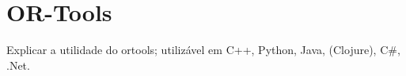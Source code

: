\documentclass[
12pt,				%
openright,			%
oneside,			%
a4paper,			%
english,			%
french,				%
spanish,			%
brazil,				%
]{abntex2}
\begin{document}

\section{OR-Tools}
\label{sec:ortools}

Explicar a utilidade do ortools; utilizável em C++, Python, Java, (Clojure), C\#, .Net.





\end{document}
